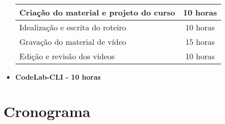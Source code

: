 \documentclass[10pt,twoside,a4paper]{article}
\begin{document}
\begin{itemize}
        \begin{center}
            \begin{tabular}{ |l|c| } 
                \hline
                     Criação do material e projeto do curso & 10 horas \\
                     \hline
                     Idealização e escrita do roteiro & 10 horas \\
                     \hline
                     Gravação do material de vídeo &  15 horas \\
                     \hline
                     Edição e revisão dos vídeos & 10 horas \\
                \hline
            \end{tabular}
        \end{center}
        
    \item \textbf{CodeLab-CLI - 10 horas} \\
        
        
  \end{itemize}
  
\section{Cronograma}
\end{document}
